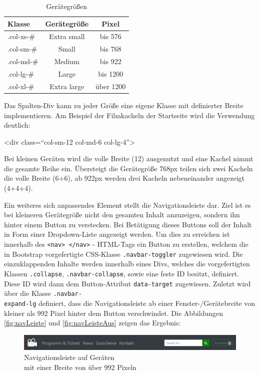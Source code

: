 	\begin{table}[H]
		\centering
		\begin{tabular}{p{} | c | c }
			\textbf{Klasse} & \textbf{Gerätegröße} & \textbf{Pixel} \\\toprule
			.col-xs-\# &  Extra small &  bis 576 \\
			.col-sm-\# &  Small &  bis 768  \\
			.col-md-\# &  Medium &  bis 922  \\
			.col-lg-\# &  Large &  bis 1200  \\
			.col-xl-\# &  Extra large &  über 1200  \\
		\end{tabular}
		\caption[Gerätegrößen]{\label{tab:gerätegrößen}Gerätegrößen }
	\end{table}
	
	Das Spalten-Div kann zu jeder Größe eine eigene Klasse mit definierter Breite implementieren. Am Beispiel der Filmkacheln der Startseite wird die Verwendung deutlich:
		\begin{center}
			<div class=“col-sm-12 col-md-6 col-lg-4”>
		\end{center}

	Bei kleinen Geräten wird die volle Breite (12) ausgenutzt und eine Kachel nimmt die gesamte Reihe ein. Übersteigt die Gerätegröße 768px teilen sich zwei Kacheln die volle Breite (6+6), ab 922px werden drei Kacheln nebeneinander angezeigt (4+4+4).
	
	Ein weiteres sich anpassendes Element stellt die Navigationsleiste dar. Ziel ist es bei kleineren Gerätegröße nicht den gesamten Inhalt anzuzeigen, sondern ihn hinter einem Button zu verstecken. Bei Betätigung dieses Buttons soll der Inhalt in Form einer Dropdown-Liste angezeigt werden. Um dies zu erreichen ist innerhalb des \texttt{<nav> </nav>} - \ac{HTML}-Tags ein Button zu erstellen, welchem die in Bootstrap vorgefertigte \acs{CSS}-Klasse \texttt{.navbar-toggler} zugewiesen wird. Die einzuklappenden Inhalte werden innerhalb eines Divs, welches die vorgefertigten Klassen \texttt{.collapse}, \texttt{.navbar-collapse}, sowie eine feste ID besitzt, definiert. Diese ID wird dann dem Button-Attribut \texttt{data-target} zugewiesen. Zuletzt wird über die Klasse \texttt{.navbar-\\expand-lg} definiert, dass die Navigationsleiste ab einer Fenster-/Gerätebreite von kleiner als 992 Pixel hinter dem Button verschwindet. Die Abbildungen \vref{fig:navLeiste} und \vref{fig:navLeisteAus} zeigen das Ergebnis:
	\begin{figure}[H]
		\centering 
		\includegraphics[width=13cm]{img/navLeiste.png}
		\captionsetup{format=hang}
		\caption[Navigationsleiste]{\label{fig:navLeiste} Navigationsleiste auf Geräten\\ mit einer Breite von über 992 Pixeln}
	\end{figure}
	
